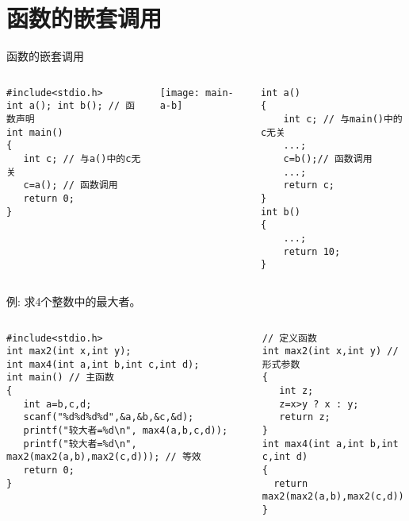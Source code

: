 
\section{函数的嵌套调用}

\begin{frame}{函数的嵌套调用}
\vspace{-0.5cm}
\begin{columns}[T]
\begin{lstlisting}
#include<stdio.h>
int a(); int b(); // 函数声明
int main() 
{ 
   int c; // 与a()中的c无关
   c=a(); // 函数调用
   return 0; 
}
\end{lstlisting}
\texttt{[image: main-a-b]}
\begin{lstlisting}[frame=leftline]
int a()
{
    int c; // 与main()中的c无关
    ...;
    c=b();// 函数调用
    ...;
    return c;
}
int b()
{
    ...;
    return 10;
}
\end{lstlisting}
\end{columns}
\medskip
\end{frame}


\begin{frame}{例: 求4个整数中的最大者。}
\begin{columns}[T]
\begin{lstlisting}
#include<stdio.h> 
int max2(int x,int y);
int max4(int a,int b,int c,int d); 
int main() // 主函数
{
   int a=b,c,d;
   scanf("%d%d%d%d",&a,&b,&c,&d);
   printf("较大者=%d\n", max4(a,b,c,d));
   printf("较大者=%d\n", max2(max2(a,b),max2(c,d))); // 等效
   return 0; 
}
\end{lstlisting}
\begin{lstlisting}[frame=leftline]
// 定义函数
int max2(int x,int y) // 形式参数
{  
   int z;
   z=x>y ? x : y;
   return z; 
}
int max4(int a,int b,int c,int d)
{
  return max2(max2(a,b),max2(c,d));
}
\end{lstlisting}
\end{columns}
~\\
\end{frame}


